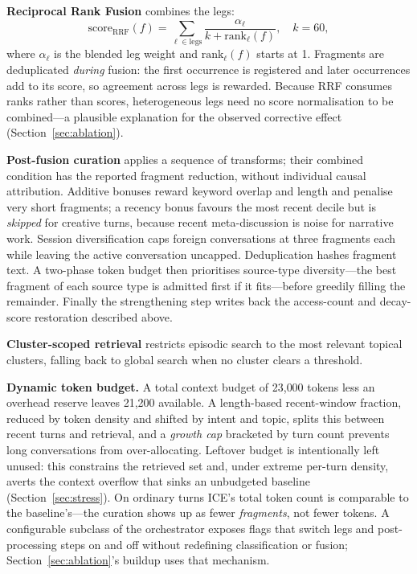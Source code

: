 \documentclass[11pt,a4paper]{article}
\begin{document}
\textbf{Reciprocal Rank Fusion} combines the legs:
\begin{equation}
\mathrm{score}_{\mathrm{RRF}}(f) = \sum_{\ell \in \mathrm{legs}} \frac{\alpha_\ell}{k + \mathrm{rank}_\ell(f)}, \quad k = 60,
\end{equation}
where $\alpha_\ell$ is the blended leg weight and $\mathrm{rank}_\ell(f)$ starts at 1. Fragments are deduplicated \emph{during} fusion: the first occurrence is registered and later occurrences add to its score, so agreement across legs is rewarded. Because RRF consumes ranks rather than scores, heterogeneous legs need no score normalisation to be combined---a plausible explanation for the observed corrective effect (Section~\ref{sec:ablation}).

\textbf{Post-fusion curation} applies a sequence of transforms; their combined condition has the reported fragment reduction, without individual causal attribution. Additive bonuses reward keyword overlap and length and penalise very short fragments; a recency bonus favours the most recent decile but is \emph{skipped} for creative turns, because recent meta-discussion is noise for narrative work. Session diversification caps foreign conversations at three fragments each while leaving the active conversation uncapped. Deduplication hashes fragment text. A two-phase token budget then prioritises source-type diversity---the best fragment of each source type is admitted first if it fits---before greedily filling the remainder. Finally the strengthening step writes back the access-count and decay-score restoration described above.

\textbf{Cluster-scoped retrieval} restricts episodic search to the most relevant topical clusters, falling back to global search when no cluster clears a threshold.

\textbf{Dynamic token budget.} A total context budget of 23{,}000 tokens less an overhead reserve leaves 21{,}200 available. A length-based recent-window fraction, reduced by token density and shifted by intent and topic, splits this between recent turns and retrieval, and a \emph{growth cap} bracketed by turn count prevents long conversations from over-allocating. Leftover budget is intentionally left unused: this constrains the retrieved set and, under extreme per-turn density, averts the context overflow that sinks an unbudgeted baseline (Section~\ref{sec:stress}). On ordinary turns ICE's total token count is comparable to the baseline's---the curation shows up as fewer \emph{fragments}, not fewer tokens. A configurable subclass of the orchestrator exposes flags that switch legs and post-processing steps on and off without redefining classification or fusion; Section~\ref{sec:ablation}'s buildup uses that mechanism.
\end{document}
